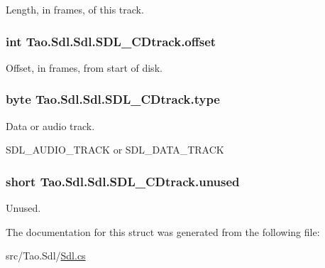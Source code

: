 Length, in frames, of this track. 

\hypertarget{struct_tao_1_1_sdl_1_1_sdl_1_1_s_d_l___c_dtrack_ae49a94c371c0d1626c09dc2f9a5225e4}{
\subsubsection[{offset}]{\setlength{\rightskip}{0pt plus 5cm}int {\bf Tao.Sdl.Sdl.SDL\_\-CDtrack.offset}}}
\label{struct_tao_1_1_sdl_1_1_sdl_1_1_s_d_l___c_dtrack_ae49a94c371c0d1626c09dc2f9a5225e4}


Offset, in frames, from start of disk. 

\hypertarget{struct_tao_1_1_sdl_1_1_sdl_1_1_s_d_l___c_dtrack_a95bceb0ab5ca32c3572ae36613e5a299}{
\subsubsection[{type}]{\setlength{\rightskip}{0pt plus 5cm}byte {\bf Tao.Sdl.Sdl.SDL\_\-CDtrack.type}}}
\label{struct_tao_1_1_sdl_1_1_sdl_1_1_s_d_l___c_dtrack_a95bceb0ab5ca32c3572ae36613e5a299}


Data or audio track. 

SDL\_\-AUDIO\_\-TRACK or SDL\_\-DATA\_\-TRACK \hypertarget{struct_tao_1_1_sdl_1_1_sdl_1_1_s_d_l___c_dtrack_aebba7b7ca29edf4232172d0b9356a5a7}{
\subsubsection[{unused}]{\setlength{\rightskip}{0pt plus 5cm}short {\bf Tao.Sdl.Sdl.SDL\_\-CDtrack.unused}}}
\label{struct_tao_1_1_sdl_1_1_sdl_1_1_s_d_l___c_dtrack_aebba7b7ca29edf4232172d0b9356a5a7}


Unused. 



The documentation for this struct was generated from the following file:\begin{DoxyCompactItemize}
\item 
src/Tao.Sdl/\hyperlink{_sdl_8cs}{Sdl.cs}\end{DoxyCompactItemize}
